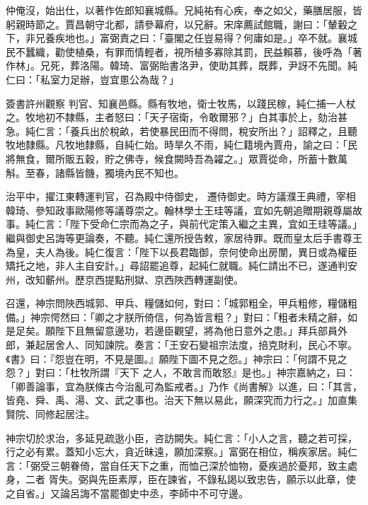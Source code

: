 \begin{pinyinscope}
 仲俺沒，始出仕，以著作佐郎知襄城縣。兄純祐有心疾，奉之如父，藥膳居服，皆躬親時節之。賈昌朝守北都，請參幕府，以兄辭。宋庠薦試館職，謝曰：「輦轂之下，非兄養疾地也。」富弼責之曰：「臺閣之任豈易得？何庸如是。」卒不就。襄城民不蠶織，勸使植桑，有罪而情輕者，視所植多寡除其罰，民益賴慕，後呼為「著作林」。兄死，葬洛陽。韓琦、富弼貽書洛尹，使助其葬，既葬，尹訝不先聞。純仁曰：「私室力足辦，豈宜慁公為哉？」



 簽書許州觀察
 判官、知襄邑縣。縣有牧地，衛士牧馬，以踐民稼，純仁捕一人杖之。牧地初不隸縣，主者怒曰：「天子宿衛，令敢爾邪？」白其事於上，劾治甚急。純仁言：「養兵出於稅畝，若使暴民田而不得問，稅安所出？」詔釋之，且聽牧地隸縣。凡牧地隸縣，自純仁始。時旱久不雨，純仁籍境內賈舟，諭之曰：「民將無食，爾所販五穀，貯之佛寺，候食闕時吾為糴之。」眾賈從命，所蓄十數萬斛。至春，諸縣皆饑，獨境內民不知也。



 治平中，擢江東轉運判官，召為殿中侍御史，
 遷侍御史。時方議濮王典禮，宰相韓琦、參知政事歐陽修等議尊崇之。翰林學士王珪等議，宜如先朝追贈期親尊屬故事。純仁言：「陛下受命仁宗而為之子，與前代定策入繼之主異，宜如王珪等議。」繼與御史呂誨等更論奏，不聽。純仁還所授告敕，家居待罪。既而皇太后手書尊王為皇，夫人為後。純仁復言：「陛下以長君臨御，奈何使命出房闈，異日或為權臣矯托之地，非人主自安計。」尋詔罷追尊，起純仁就職。純仁請出不已，遂通判安
 州，改知蘄州。歷京西提點刑獄、京西陜西轉運副使。



 召還，神宗問陜西城郭、甲兵、糧儲如何，對曰：「城郭粗全，甲兵粗修，糧儲粗備。」神宗愕然曰：「卿之才朕所倚信，何為皆言粗？」對曰：「粗者未精之辭，如是足矣。願陛下且無留意邊功，若邊臣觀望，將為他日意外之患。」拜兵部員外郎，兼起居舍人、同知諫院。奏言：「王安石變祖宗法度，掊克財利，民心不寧。《書》曰：『怨豈在明，不見是圖。』願陛下圖不見之怨。」神宗曰：「何謂不見之怨？」對曰：「杜牧所謂『天下
 之人，不敢言而敢怒』是也。」神宗嘉納之，曰：「卿善論事，宜為朕條古今治亂可為監戒者。」乃作《尚書解》以進，曰：「其言，皆堯、舜、禹、湯、文、武之事也。治天下無以易此，願深究而力行之。」加直集賢院、同修起居注。



 神宗切於求治，多延見疏逖小臣，咨訪闕失。純仁言：「小人之言，聽之若可採，行之必有累。蓋知小忘大，貪近昧遠，願加深察。」富弼在相位，稱疾家居。純仁言：「弼受三朝眷倚，當自任天下之重，而恤己深於恤物，憂疾過於憂邦，致主處身，二者
 胥失。弼與先臣素厚，臣在諫省，不錄私謁以致忠告，願示以此章，使之自省。」又論呂誨不當罷御史中丞，李師中不可守邊。




\end{pinyinscope}
